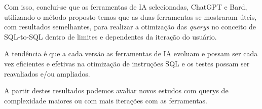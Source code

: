 \documentclass[12pt]{article}
\begin{document}
Com isso, conclui-se que as ferramentas de IA selecionadas, ChatGPT e Bard, utilizando o método proposto temos que as duas ferramentas se mostraram úteis, com resultados semelhantes, para realizar a otimização das \emph{querys} no conceito de SQL-to-SQL dentro de limites e dependentes da iteração do usuário.

A tendência é que a cada versão as ferramentas de IA evoluam e possam ser cada vez eficientes e efetivas na otimização de instruções SQL e os testes possam ser reavaliados e/ou ampliados.

A partir destes resultados podemos avaliar novos estudos com querys de complexidade maiores ou com mais iterações com as ferramentas.




\cite{subali2018new}
\cite{postgresql_explain}
\cite{robinson2014cost}
\cite{li2023can}
\cite{linkedin_compare_texttosql}
\cite{devblogs_microsoft}
\end{document}
